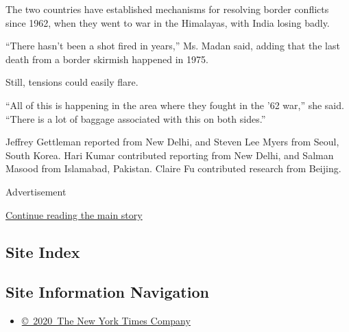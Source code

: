 The two countries have established mechanisms for resolving border
conflicts since 1962, when they went to war in the Himalayas, with India
losing badly.

``There hasn't been a shot fired in years,'' Ms. Madan said, adding that
the last death from a border skirmish happened in 1975.

Still, tensions could easily flare.

``All of this is happening in the area where they fought in the '62
war,'' she said. ``There is a lot of baggage associated with this on
both sides.''

Jeffrey Gettleman reported from New Delhi, and Steven Lee Myers from
Seoul, South Korea. Hari Kumar contributed reporting from New Delhi, and
Salman Masood from Islamabad, Pakistan. Claire Fu contributed research
from Beijing.

Advertisement

\protect\hyperlink{after-bottom}{Continue reading the main story}

\hypertarget{site-index}{%
\subsection{Site Index}\label{site-index}}

\hypertarget{site-information-navigation}{%
\subsection{Site Information
Navigation}\label{site-information-navigation}}

\begin{itemize}
\tightlist
\item
  \href{https://help.nytimes.com/hc/en-us/articles/115014792127-Copyright-notice}{©~2020~The
  New York Times Company}
\end{itemize}

